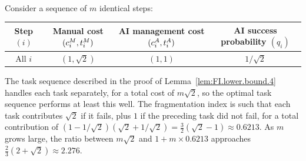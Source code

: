 \documentclass[12pt, final]{article}
\begin{document}
\\[-0.2em]
\noindent{\color{black!25}\rule{\linewidth}{0.4pt}}\par\vspace{1em}
\renewcommand\theexample{OA.B.\arabic{example}}
\setcounter{example}{1}
\begin{example}
\label{ex:FI.lower.gap}
Consider a sequence of $m$ identical steps:
\begin{center}
\begin{tabular}{c|ccc}
\toprule
\makecell{Step\\$(i)$} & \makecell{Manual cost\\$(c^{M}_{i}, t^{M}_{i})$} & \makecell{AI management cost\\$(c^{A}_{i}, t^{A}_{i})$} & \makecell{AI success probability\\$(q_i)$} \\
\midrule
All $i$ & $(1, \sqrt{2})$ & $(1, 1)$ & $1/\sqrt{2}$ \\
\bottomrule
\end{tabular}
\end{center}
The task sequence described in the proof of Lemma~\ref{lem:FI.lower.bound.4} handles each task separately, for a total cost of $m \sqrt{2}$, so the optimal task sequence performs at least this well.
The fragmentation index is such that each task contributes $\sqrt{2}$ if it fails, plus $1$ if the preceding task did not fail, for a total contribution of $(1-1/\sqrt{2})(\sqrt{2} + 1/\sqrt{2}) = \tfrac{3}{2}(\sqrt{2}-1) \approx 0.6213$.
As $m$ grows large, the ratio between $m\sqrt{2}$ and $1 + m \times 0.6213$ approaches $\tfrac{2}{3}(2+\sqrt{2}) \approx 2.276$.
\end{example}
\clearpage
\end{document}
